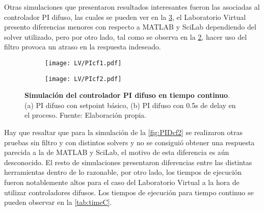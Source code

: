         Otras simulaciones que presentaron resultados interesantes fueron las asociadas al controlador PI difuso, las cuales se pueden ver en la \cref{fig:PIdifuso}, el Laboratorio Virtual presento diferencias menores con respecto a MATLAB y SciLab dependiendo del solver utilizado, pero por otro lado, tal como se observa en la \cref{fig:PIf2}, hacer uso del filtro provoca un atraso en la respuesta indeseado. 

        \begin{figure}[htb]
            \centering
            \begin{subfigure}[t]{0.49\textwidth}
                \centering
                \texttt{[image: LV/PIcf1.pdf]}
                \caption{}
                \label{fig:PIf1}
            \end{subfigure}
            \hfill
            \begin{subfigure}[t]{0.49\textwidth}
                \centering
                \texttt{[image: LV/PIcf2.pdf]}
                \caption{}
                \label{fig:PIf2}
            \end{subfigure}
            \caption[Simulación del controlador PI difuso en tiempo continuo]{\textbf{Simulación del controlador PI difuso en tiempo continuo}. (a) PI difuso con setpoint básico, (b) PI difuso con 0.5s de delay en el proceso. Fuente: Elaboración propia. \label{fig:PIdifuso}}
        \end{figure}

        Hay que resaltar que para la simulación de la \cref{fig:PIDcf2} se realizaron otras pruebas sin filtro y con distintos solvers y no se consiguió obtener una respuesta parecida a la de MATLAB y SciLab, el motivo de esta diferencia es aún desconocido. El resto de simulaciones presentaron diferencias entre las distintas herramientas dentro de lo razonable, por otro lado, los tiempos de ejecución fueron notablemente altos para el caso del Laboratorio Virtual a la hora de utilizar controladores difusos. Los tiempos de ejecución para tiempo continuo se pueden observar en la \cref{tab:timeC}.

